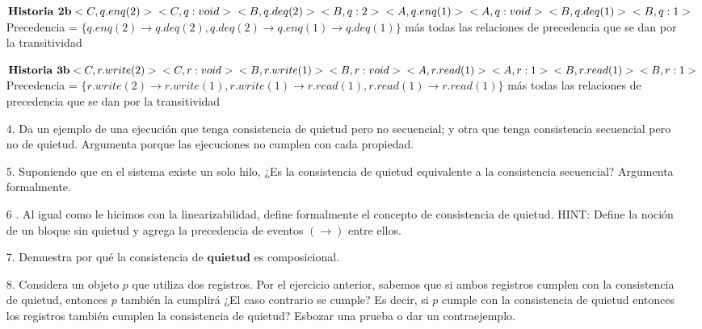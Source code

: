 \documentclass[12pt, letterpaper]{article}
\begin{document}
\begin{itemize}
$\textbf{Historia 2b}\\
<C, q.enq(2)>\\
<C, q:void>\\
<B, q.deq(2)>\\
<B, q:2>\\
<A, q.enq(1)>\\
<A, q:void>\\
<B, q.deq(1)>\\
<B, q:1>\\
$\\
Precedencia = $\{q.enq(2) \rightarrow q.deq(2), q.deq(2) \rightarrow q.enq(1) \rightarrow q.deq(1) \}$ más todas las relaciones de precedencia que se dan por la transitividad

$\textbf{Historia 3b}\\
<C, r.write(2)>\\
<C, r:void>\\
<B, r.write(1)>\\
<B, r:void>\\
<A, r.read(1)>\\
<A, r:1>\\
<B, r.read(1)>\\
<B, r:1>\\
$\\
Precedencia = $\{ r.write(2) \rightarrow r.write(1), r.write(1) \rightarrow r.read(1), r.read(1) \rightarrow r.read(1)\}$ más todas las relaciones de precedencia que se dan por la transitividad

\item[4. ] Da un ejemplo de una ejecución que tenga consistencia de quietud pero no secuencial; y otra que tenga consistencia secuencial pero no de quietud. Argumenta porque las ejecuciones no cumplen con cada propiedad.

\item[5. ] Suponiendo que en el sistema existe un solo hilo, ¿Es la consistencia de quietud
equivalente a la consistencia secuencial? Argumenta formalmente.

\item[6 .] Al igual como le hicimos con la linearizabilidad, define formalmente el concepto
de consistencia de quietud. HINT: Define la noción de un bloque sin quietud y agrega la precedencia de eventos $(\rightarrow)$ entre ellos.

\item[7. ]Demuestra por qué la consistencia de $\textbf{quietud}$ es composicional.

\item[8. ] Considera un objeto $p$ que utiliza dos registros. Por el ejercicio anterior, sabemos que si ambos registros cumplen con la consistencia de quietud, entonces $p$ también la cumplirá ¿El caso contrario se cumple? Es decir, si $p$ cumple con la consistencia de quietud entonces los registros también cumplen la consistencia de quietud? Esbozar una prueba o dar un contraejemplo.


\end{itemize}
\end{document}

